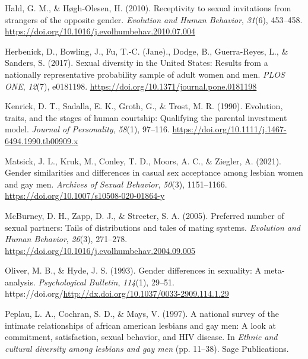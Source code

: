 \documentclass[
  11pt,
]{article}
\newlength{\cslhangindent}
\newlength{\cslentryspacingunit} %
\newenvironment{CSLReferences}[2] %
 {%
  \setlength{\parindent}{0pt}
  \ifodd #1
  \let\oldpar\par
  \def\par{\hangindent=\cslhangindent\oldpar}
  \fi
  \setlength{\parskip}{#2\cslentryspacingunit}
 }%
 {}
\begin{document}
\begin{CSLReferences}{1}{0}
\leavevmode{}%
Hald, G. M., \& Høgh-Olesen, H. (2010). Receptivity to sexual
invitations from strangers of the opposite gender. \emph{Evolution and
Human Behavior}, \emph{31}(6), 453--458.
\url{https://doi.org/10.1016/j.evolhumbehav.2010.07.004}

\leavevmode{}%
Herbenick, D., Bowling, J., Fu, T.-C. (Jane)., Dodge, B., Guerra-Reyes,
L., \& Sanders, S. (2017). Sexual diversity in the {United States}:
Results from a nationally representative probability sample of adult
women and men. \emph{{PLOS} {ONE}}, \emph{12}(7), e0181198.
\url{https://doi.org/10.1371/journal.pone.0181198}

\leavevmode{}%
Kenrick, D. T., Sadalla, E. K., Groth, G., \& Trost, M. R. (1990).
Evolution, traits, and the stages of human courtship: Qualifying the
parental investment model. \emph{Journal of Personality}, \emph{58}(1),
97--116. \url{https://doi.org/10.1111/j.1467-6494.1990.tb00909.x}

\leavevmode{}%
Matsick, J. L., Kruk, M., Conley, T. D., Moors, A. C., \& Ziegler, A.
(2021). Gender similarities and differences in casual sex acceptance
among lesbian women and gay men. \emph{Archives of Sexual Behavior},
\emph{50}(3), 1151--1166.
\url{https://doi.org/10.1007/s10508-020-01864-y}

\leavevmode{}%
McBurney, D. H., Zapp, D. J., \& Streeter, S. A. (2005). Preferred
number of sexual partners: Tails of distributions and tales of mating
systems. \emph{Evolution and Human Behavior}, \emph{26}(3), 271--278.
\url{https://doi.org/10.1016/j.evolhumbehav.2004.09.005}

\leavevmode{}%
Oliver, M. B., \& Hyde, J. S. (1993). Gender differences in sexuality: A
meta-analysis. \emph{Psychological Bulletin}, \emph{114}(1), 29--51.
https://doi.org/\url{http://dx.doi.org/10.1037/0033-2909.114.1.29}

\leavevmode{}%
Peplau, L. A., Cochran, S. D., \& Mays, V. (1997). A national survey of
the intimate relationships of african american lesbians and gay men: A
look at commitment, satisfaction, sexual behavior, and {HIV} disease. In
\emph{Ethnic and cultural diversity among lesbians and gay men} (pp.
11--38). Sage Publications.


\end{CSLReferences}
\end{document}
